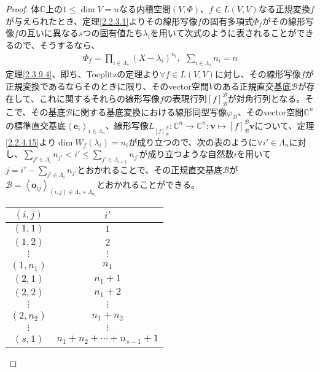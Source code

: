 \documentclass[dvipdfmx]{jsarticle}
\begin{document}
\begin{proof}
体$\mathbb{C}$上の$1 \leq \dim V = n$なる内積空間$(V,\varPhi)$、$f \in L(V,V)$なる正規変換$f$が与えられたとき、定理\ref{2.2.3.1}よりその線形写像$f$の固有多項式$\varPhi_{f}$がその線形写像$f$の互いに異なる$s$つの固有値たち$\lambda_{i}$を用いて次式のように表されることができるので、そうするなら、
\begin{align*}
\varPhi_{f} = \prod_{i \in \varLambda_{s}} \left( X - \lambda_{i} \right)^{n_{i}},\ \ \sum_{i \in \varLambda_{s}} n_{i} = n
\end{align*}
定理\ref{2.3.9.4}、即ち、Toeplitzの定理より$\forall f \in L(V,V)$に対し、その線形写像$f$が正規変換であるならそのときに限り、そのvector空間$V$のある正規直交基底$\mathcal{B}$が存在して、これに関するそれらの線形写像$f$の表現行列$[ f]_{\mathcal{B}}^{\mathcal{B}}$が対角行列となる。そこで、その基底$\mathcal{B}$に関する基底変換における線形同型写像$\varphi_{\mathcal{B}}$、そのvector空間$\mathbb{C}^{n}$の標準直交基底$\left\langle \mathbf{e}_{i} \right\rangle_{i \in \varLambda_{n}}$、線形写像$L_{[ f]_{\mathcal{B}}^{\mathcal{B}}}:\mathbb{C}^{n} \rightarrow \mathbb{C}^{n};\mathbf{v} \mapsto [ f]_{\mathcal{B}}^{\mathcal{B}}\mathbf{v}$について、定理\ref{2.2.4.15}より$\dim{W_{f}\left( \lambda_{i} \right)} = n_{i}$が成り立つので、次の表のように$\forall i' \in \varLambda_{n}$に対し、$\sum_{j' \in \varLambda_{i}} n_{j'} < i' \leq \sum_{j' \in \varLambda_{i + 1}} n_{j'}$が成り立つような自然数$i$を用いて$j = i' - \sum_{j' \in \varLambda_{i}} n_{j'}$とおかれることで、その正規直交基底$\mathcal{B}$が$\mathcal{B} =\left\langle \mathbf{o}_{ij} \right\rangle_{(i,j) \in \varLambda_{s} \times \varLambda_{n_{i}}}$とおかれることができる。
\begin{longtable}[c]{|c|c|}
  \hline
  $(i,j)$ & $i'$ \\
  \hline \hline
  $(1,1)$ & $1$ \\
  \hline
  $(1,2)$ & $2$ \\
  \hline
  $\vdots$ & $\vdots$ \\
  \hline
  $\left( 1,n_{1} \right)$ & $n_{1}$ \\
  \hline
  $(2,1)$ & $n_{1} + 1$ \\
  \hline
  $(2,2)$ & $n_{1} + 2$ \\
  \hline
  $\vdots$ & $\vdots$ \\
  \hline
  $\left( 2,n_{2} \right)$ & $n_{1} + n_{2}$ \\
  \hline
  $\vdots$ & $\vdots$ \\
  \hline
  $(s,1)$ & $n_{1} + n_{2} + \cdots + n_{s - 1} + 1$ \\

\end{longtable}
\end{proof}
\end{document}
